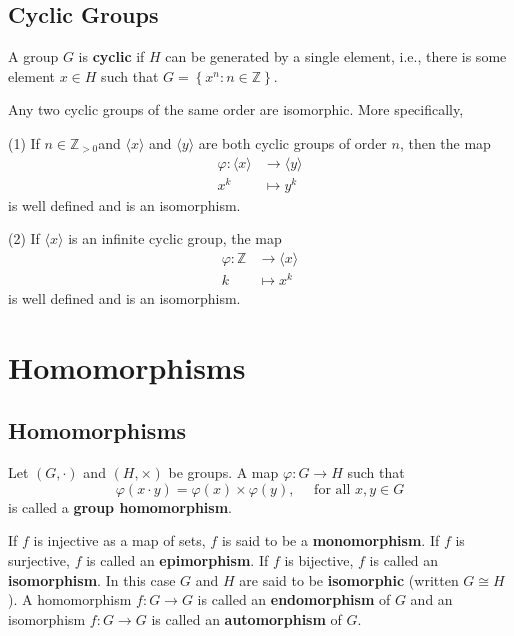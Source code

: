 \subsection{Cyclic Groups} %
\begin{definition}
    A group $G$ is \textbf{cyclic} if $H$ can be generated by a single element, i.e., there is some element $x \in H$ such that $G=\left\{x^n : n \in \mathbb{Z}\right\}$.
\end{definition}

\begin{theorem}
    Any two cyclic groups of the same order are isomorphic. More specifically,

    (1) If $n \in \mathbb{Z}_{>0}$and $\langle x\rangle$ and $\langle y\rangle$ are both cyclic groups of order $n$, then the map
    \[
        \begin{aligned}
            \varphi:\langle x\rangle & \rightarrow\langle y\rangle \\
            x^k                      & \mapsto y^k
        \end{aligned}
    \]
    is well defined and is an isomorphism.

    (2) If $\langle x\rangle$ is an infinite cyclic group, the map
    \[
        \begin{aligned}
            \varphi: \mathbb{Z} & \rightarrow\langle x\rangle \\
            k                   & \mapsto x^k
        \end{aligned}
    \]
    is well defined and is an isomorphism.
\end{theorem}




\section{Homomorphisms}  %

\subsection{Homomorphisms} %

\begin{definition}
    Let $(G, \cdot)$ and $(H, \times)$ be groups. A map $\varphi: G \rightarrow H$ such that
    \begin{equation*}
        \varphi(x \cdot y)=\varphi(x) \times \varphi(y), \quad \text { for all } x, y \in G
    \end{equation*}
    is called a \textbf{group homomorphism}.

    If $f$ is injective as a map of sets, $f$ is said to be a \textbf{monomorphism}.
    If $f$ is surjective, $f$ is
    called an \textbf{epimorphism}.
    If $f$ is bijective, $f$ is called an \textbf{isomorphism}.
    In this case $G$ and $H$
    are said to be \textbf{isomorphic} (written $G \cong H$).
    A homomorphism $f: G \rightarrow G $ is called an \textbf{endomorphism} of $G$ and an isomorphism $f: G \rightarrow G $ is called an \textbf{automorphism} of $G$.
\end{definition}

